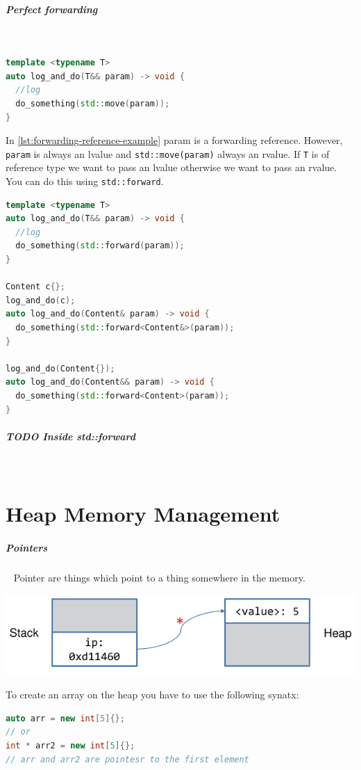 \documentclass[11pt,twoside,landscape]{article}
\begin{document}
\begin{multicols}{2}
\subparagraph{Perfect forwarding} \
\label{sec:org7c4aff6}
\begin{lstlisting}[language=c++,label=lst:org87971fd,caption={Forwarding Reference example},captionpos=b,numbers=none]
template <typename T>
auto log_and_do(T&& param) -> void {
  //log
  do_something(std::move(param));
}
\end{lstlisting}

In \autoref{lst:forwarding-reference-example} param is a forwarding reference.
However, \texttt{param} is always an lvalue and \texttt{std::move(param)} always an rvalue.
If \texttt{T} is of reference type we want to pass an lvalue otherwise we want to pass an rvalue.
You can do this using \texttt{std::forward}.

\begin{lstlisting}[language=c++,label=lst:org92ee8a1,caption={Forwarding Reference using std::forward example},captionpos=b,numbers=none]
template <typename T>
auto log_and_do(T&& param) -> void {
  //log
  do_something(std::forward(param));
}

Content c{};
log_and_do(c);
auto log_and_do(Content& param) -> void {
  do_something(std::forward<Content&>(param));
}

log_and_do(Content{});
auto log_and_do(Content&& param) -> void {
  do_something(std::forward<Content>(param));
}
\end{lstlisting}
\subparagraph{{\bfseries\sffamily TODO} Inside std::forward} \
\label{sec:org5c1a866}

\section{Heap Memory Management}
\label{sec:org9f087f3}
\subparagraph{Pointers} \
\label{sec:org3b65534}
Pointer are things which point to a thing somewhere in the memory.


{
\begin{center}
\includegraphics[width=.9\linewidth]{img/pointer_to_heap.png}
\end{center}
\label{fig:point-from-stack-to-heap}
}
To create an array on the heap you have to use the following synatx:
\begin{lstlisting}[language=c++,numbers=none]
auto arr = new int[5]{};
// or
int * arr2 = new int[5]{};
// arr and arr2 are pointesr to the first element
\end{lstlisting}


\end{multicols}
\end{document}
